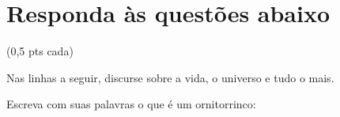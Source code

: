 \documentclass{provaifrs}
\begin{document}
\section{Responda às questões abaixo}
\centering(0,5 pts cada)
\begin{questoes}
  \item Nas linhas a seguir, discurse sobre a vida, o universo e tudo o mais.
  \item Escreva com suas palavras o que é um ornitorrinco:
\end{questoes}
\end{document}
